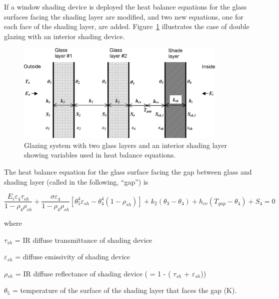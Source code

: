 If a window shading device is deployed the heat balance equations for the glass surfaces facing the shading layer are modified, and two new equations, one for each face of the shading layer, are added. Figure~\ref{fig:glazing-system-with-two-glass-layers-and-an} illustrates the case of double glazing with an interior shading device.

\begin{figure}[hbtp] %
\centering
\includegraphics[width=0.9\textwidth, height=0.9\textheight, keepaspectratio=true]{media/image1663.png}
\caption{Glazing system with two glass layers and an interior shading layer showing variables used in heat balance equations. \protect \label{fig:glazing-system-with-two-glass-layers-and-an}}
\end{figure}

The heat balance equation for the glass surface facing the gap between glass and shading layer (called in the following, ``gap'') is

\begin{equation}
\frac{{{E_i}{\varepsilon_4}{\tau_{sh}}}}{{1 - {\rho_4}{\rho_{sh}}}} + \frac{{\sigma {\varepsilon_4}}}{{1 - {\rho_4}{\rho_{sh}}}}\left[ {\theta_5^4{\varepsilon_{sh}} - \theta_4^4(1 - {\rho_{sh}})} \right] + {k_2}\left( {{\theta_3} - {\theta_4}} \right) + {h_{cv}}\left( {{T_{gap}} - {\theta_4}} \right) + {S_4} = 0
\end{equation}

where

\emph{$\tau$\(_{sh}\)} = IR diffuse transmittance of shading device

\emph{$\varepsilon$\(_{sh}\)} = diffuse emissivity of shading device

\emph{$\rho$\(_{sh}\)} = IR diffuse reflectance of shading device ( = 1 - ( \emph{$\tau$\(_{sh}\)} + \emph{$\varepsilon$\(_{sh}\)}))

\emph{$\theta$\(_{5}\)} = temperature of the surface of the shading layer that faces the gap (K).

